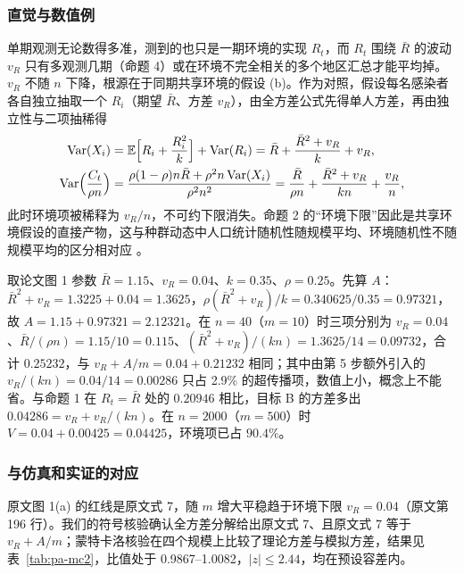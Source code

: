 \subsubsection{直觉与数值例}

单期观测无论数得多准，测到的也只是一期环境的实现 $R_t$，而 $R_t$ 围绕 $\bar R$ 的波动 $v_R$ 只有多观测几期（命题 4）或在环境不完全相关的多个地区汇总才能平均掉。$v_R$ 不随 $n$ 下降，根源在于同期共享环境的假设 (b)。作为对照，假设每名感染者各自独立抽取一个 $R_i$（期望 $\bar R$、方差 $v_R$），由全方差公式先得单人方差，再由独立性与二项抽稀得
\begin{align*}
\operatorname{Var}(X_i)&=\mathbb{E}\Bigl[R_i+\frac{R_i^2}{k}\Bigr]+\operatorname{Var}(R_i)=\bar R+\frac{\bar R^2+v_R}{k}+v_R,\\
\operatorname{Var}\Bigl(\frac{C_t}{\rho n}\Bigr)&=\frac{\rho(1-\rho)n\bar R+\rho^2n\operatorname{Var}(X_i)}{\rho^2n^2}=\frac{\bar R}{\rho n}+\frac{\bar R^2+v_R}{kn}+\frac{v_R}{n},
\end{align*}
此时环境项被稀释为 $v_R/n$，不可约下限消失。命题 2 的“环境下限”因此是共享环境假设的直接产物，这与种群动态中人口统计随机性随规模平均、环境随机性不随规模平均的区分相对应 \citep{engen1998demographic}。

取论文图 1 参数 $\bar R=1.15$、$v_R=0.04$、$k=0.35$、$\rho=0.25$。先算 $A$：$\bar R^2+v_R=1.3225+0.04=1.3625$，$\rho(\bar R^2+v_R)/k=0.340625/0.35=0.97321$，故 $A=1.15+0.97321=2.12321$。在 $n=40$（$m=10$）时三项分别为 $v_R=0.04$、$\bar R/(\rho n)=1.15/10=0.115$、$(\bar R^2+v_R)/(kn)=1.3625/14=0.09732$，合计 $0.25232$，与 $v_R+A/m=0.04+0.21232$ 相同；其中由第 5 步额外引入的 $v_R/(kn)=0.04/14=0.00286$ 只占 2.9\% 的超传播项，数值上小，概念上不能省。与命题 1 在 $R_t=\bar R$ 处的 $0.20946$ 相比，目标 B 的方差多出 $0.04286=v_R+v_R/(kn)$。在 $n=2000$（$m=500$）时 $V=0.04+0.00425=0.04425$，环境项已占 $90.4\%$。

\subsubsection{与仿真和实证的对应}

原文图 1(a) 的红线是原文式 7，随 $m$ 增大平稳趋于环境下限 $v_R=0.04$（原文第 196 行）。我们的符号核验确认全方差分解给出原文式 7、且原文式 7 等于 $v_R+A/m$；蒙特卡洛核验在四个规模上比较了理论方差与模拟方差，结果见表~\ref{tab:pa-mc2}，比值处于 0.9867--1.0082，$|z|\le2.44$，均在预设容差内。

